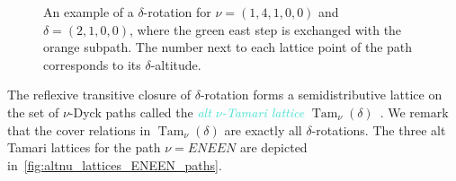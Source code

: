 \documentclass[11pt]{amsart}
\newcommand{\gray}{white!50!gray}
\newcounter{pick}
\newcounter{valley}
\newcounter{height}
\newcounter{previousheight}
\newcounter{totalheight}
\newcounter{width}
\newcommand{\nuPath}[7]{
\begin{tikzpicture}[
    scale=#3,
    pathedge/.style={line width=1.3pt}
]

\setcounter{pick}{0}
\setcounter{valley}{0}
\setcounter{height}{0}
\setcounter{previousheight}{0}
\setcounter{totalheight}{-1}


\foreach \step in {#1}{
    \addtocounter{totalheight}{1}
}

\draw[\gray,dashed] (0,0) -- (0,\thetotalheight);

\foreach \step in {#1}{

    \addtocounter{valley}{\step}

    \draw[\gray,dashed] (0,\theheight) -- (\thevalley,\theheight);

    \ifthenelse{\thepick=\thevalley}{}{
        \pgfmathparse{\thepick+1}
        \let\respick\pgfmathresult
        \foreach \x in {\respick,...,\thevalley}{
            \draw[\gray,dashed] (\x,\theheight) -- (\x,\thetotalheight);
        }
    }

    \addtocounter{pick}{\step}
    \addtocounter{height}{1}
}


\setcounter{pick}{0}
\setcounter{valley}{0}
\setcounter{height}{0}

\foreach \step in {#2}{

    \addtocounter{valley}{\step}

    \draw[pathedge]
        (\thepick,\thepreviousheight)
        --
        (\thepick,\theheight)
        --
        (\thevalley,\theheight);

    \addtocounter{pick}{\step}
    \setcounter{previousheight}{\theheight}
    \addtocounter{height}{1}
}


\foreach \a/\b/\c/\d in {#4}{
    \ifthenelse{\equal{\c}{}}{}{
        \draw[\c,line width=.5pt] (\a,\b) circle(.25);
    }
    \fill[\d,line width=.5pt] (\a,\b) circle(.15);
}


\foreach \a/\b/\c/\d/\e in {#5}{
    \draw[\d] (\a,\b) node[scale=.9,anchor=\e]{\c};
}


#7

\end{tikzpicture}
}
\newcommand{\altTam}[2]{\operatorname{Tam}_{#1}(#2)}
\newcommand{\dfn}[1]{\textcolor{Turquoise}{\emph{#1}}}
\theoremstyle{definition}
\begin{document}
\begin{figure}[ht]
\begin{center}


        

        








\end{center}
\caption{An example of a $\delta$-rotation for $\nu=(1,4,1,0,0)$ and $\delta=(2,1,0,0)$, where the green east step is exchanged with the orange subpath. The number next to each lattice point of the path corresponds to its $\delta$-altitude.}
\label{fig:delta_rotation_path}
\end{figure}

The reflexive transitive closure of $\delta$-rotation forms a semidistributive lattice on the set of $\nu$-Dyck paths called the \dfn{alt $\nu$-Tamari lattice} $\altTam{\nu}{\delta}$~\cite{ceballos2024altnu}. We remark that the cover relations in $\altTam{\nu}{\delta}$ are exactly all $\delta$-rotations. The three alt Tamari lattices for the path $\nu = ENEEN$ are depicted in~\cref{fig:altnu_lattices_ENEEN_paths}.
\end{document}
